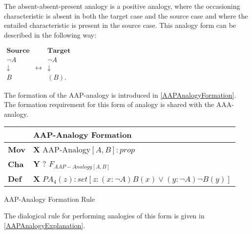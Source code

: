 				The absent-absent-present analogy is a positive analogy, where the occasioning characteristic is absent in both the target case and the source case and where the entailed characteristic is present in the source case. This analogy form can be described in the following way:
                	\begin{table}[H]
                	\centering	
                	$
                    \begin{array}{ccc}
                    	\textbf{Source} &                 & \textbf{Target} \\
                    	\neg A          &  & \neg A          \\
                    	\downarrow      & \leftrightarrow & \downarrow      \\
                    	B               &  & (B).
                    \end{array}
               	 	$
               	 	\end{table}
               	 The formation of the AAP-analogy is introduced in \autoref{AAPAnalogyFormation}. The formation requirement for this form of analogy is shared with the AAA-analogy. 
               	 	
               		\begin{Scheme}[H]\footnotesize
               		\centering
               		\begin{tabular}{l l}
               			                   & \textbf{AAP-Analogy Formation} \\ \toprule
               			\textbf{Mov}      & \textbf{X} AAP-Analogy$[A,B] : prop$ \\ \midrule
               			\textbf{Cha} & \textbf{Y} ? $F_{AAP-Analogy[A,B]}$ \\ \midrule
               			\textbf{Def}   & \textbf{X} $PA_4(z) : set [z : (x : \neg A) B(x) \lor (y : \neg A) \neg B(y)]$ \\ \bottomrule
               		\end{tabular}
               		\caption{AAP-Analogy Formation Rule}
               		\label{AAPAnalogyFormation}
					\end{Scheme} 	
               	 	
               	 \noindent The dialogical rule for performing analogies of this form is given in \autoref{AAPAnalogyExplanation}.
					
